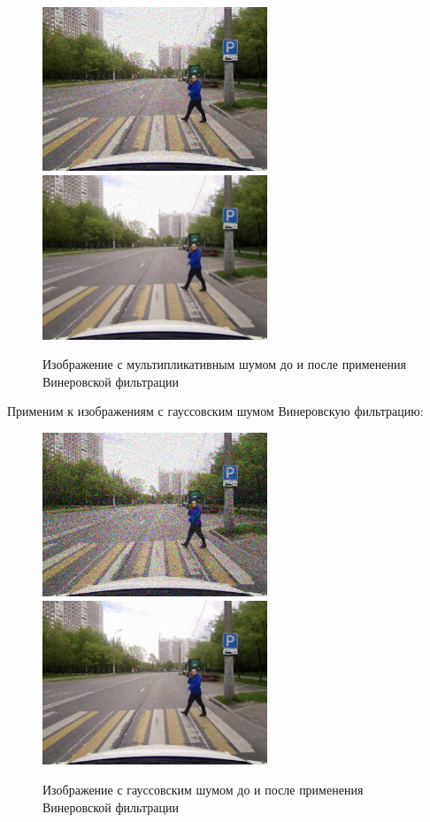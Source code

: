 \begin{figure}[hbt!]
    \centering
    \includegraphics[width=0.6\textwidth]{../outputs/image_mltp_noise.png}
    \includegraphics[width=0.6\textwidth]{../outputs/image_quant_filter.png}
    \caption{Изображение с мультипликативным шумом до и после применения Винеровской фильтрации}
    \label{fig:stich_images}
\end{figure}

\pagebreak
Применим к изображениям с гауссовским шумом Винеровскую фильтрацию:

\begin{figure}[hbt!]
    \centering
    \includegraphics[width=0.6\textwidth]{../outputs/image_gauss_noise.png}
    \includegraphics[width=0.6\textwidth]{../addition/image_gauss_quant_filter_k3.png}
    \caption{Изображение с гауссовским шумом до и после применения Винеровской фильтрации}
    \label{fig:stich_images}
\end{figure}

